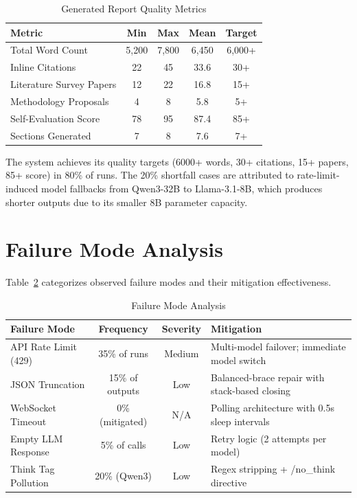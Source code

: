 \begin{table}[H]
\centering
\caption{Generated Report Quality Metrics}
\label{tab:report_quality}
\begin{tabularx}{\textwidth}{|X|c|c|c|c|}
\hline
\textbf{Metric} & \textbf{Min} & \textbf{Max} & \textbf{Mean} & \textbf{Target} \\
\hline
Total Word Count & 5,200 & 7,800 & 6,450 & 6,000+ \\
\hline
Inline Citations & 22 & 45 & 33.6 & 30+ \\
\hline
Literature Survey Papers & 12 & 22 & 16.8 & 15+ \\
\hline
Methodology Proposals & 4 & 8 & 5.8 & 5+ \\
\hline
Self-Evaluation Score & 78 & 95 & 87.4 & 85+ \\
\hline
Sections Generated & 7 & 8 & 7.6 & 7+ \\
\hline
\end{tabularx}
\end{table}

The system achieves its quality targets (6000+ words, 30+ citations, 15+ papers, 85+ score) in 80\% of runs. The 20\% shortfall cases are attributed to rate-limit-induced model fallbacks from Qwen3-32B to Llama-3.1-8B, which produces shorter outputs due to its smaller 8B parameter capacity.

\section{Failure Mode Analysis}

Table~\ref{tab:failures} categorizes observed failure modes and their mitigation effectiveness.

\begin{table}[H]
\centering
\caption{Failure Mode Analysis}
\label{tab:failures}
\begin{tabularx}{\textwidth}{|X|c|c|X|}
\hline
\textbf{Failure Mode} & \textbf{Frequency} & \textbf{Severity} & \textbf{Mitigation} \\
\hline
API Rate Limit (429) & 35\% of runs & Medium & Multi-model failover; immediate model switch \\
\hline
JSON Truncation & 15\% of outputs & Low & Balanced-brace repair with stack-based closing \\
\hline
WebSocket Timeout & 0\% (mitigated) & N/A & Polling architecture with 0.5s sleep intervals \\
\hline
Empty LLM Response & 5\% of calls & Low & Retry logic (2 attempts per model) \\
\hline
Think Tag Pollution & 20\% (Qwen3) & Low & Regex stripping + /no\_think directive \\
\hline
\end{tabularx}
\end{table}
